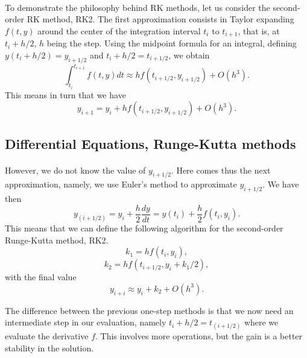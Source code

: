 \documentclass[%
oneside,                 %
final,                   %
10pt]{article}
\begin{document}
\paragraph{}
To demonstrate the philosophy behind RK methods, let us consider
the second-order RK method, RK2.
The first approximation consists in Taylor expanding $f(t,y)$
around the center of the integration interval $t_i$ to $t_{i+1}$,
that is, at $t_i+h/2$, $h$ being the step.
Using the midpoint formula for an integral, 
defining $y(t_i+h/2) = y_{i+1/2}$ and   
$t_i+h/2 = t_{i+1/2}$, we obtain
\begin{equation}
    \int_{t_i}^{t_{i+1}} f(t,y) dt \approx hf(t_{i+1/2},y_{i+1/2}) +O(h^3).
\end{equation} 
This means in turn that we have
\begin{equation}
     y_{i+1}=y_i + hf(t_{i+1/2},y_{i+1/2}) +O(h^3).
\end{equation}





\subsection*{Differential Equations, Runge-Kutta methods}

\paragraph{}
However, we do not know the value of   $y_{i+1/2}$. Here comes thus the next approximation, namely, we use Euler's
method to approximate $y_{i+1/2}$. We have then
\begin{equation}
   y_{(i+1/2)}=y_i + \frac{h}{2}\frac{dy}{dt} =
   y(t_i) + \frac{h}{2}f(t_i,y_i).
\end{equation}
This means that we can define the following algorithm for 
the second-order Runge-Kutta method, RK2.
\begin{equation} 
  k_1=hf(t_i,y_i),
\end{equation} 
\begin{equation}
  k_2=hf(t_{i+1/2},y_i+k_1/2),
\end{equation}
with the final value
\begin{equation} 
  y_{i+i}\approx y_i + k_2 +O(h^3). 
\end{equation}

The difference between the previous one-step methods 
is that we now need an intermediate step in our evaluation,
namely $t_i+h/2 = t_{(i+1/2)}$ where we evaluate the derivative $f$. 
This involves more operations, but the gain is a better stability
in the solution.
\end{document}
